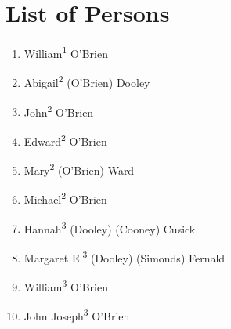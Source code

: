 \chapter{List of Persons}
\begin{enumerate}
	\item \label{per:William1OBrien} William\textsuperscript{1} O'Brien
	\item \label{per:Abigail2OBrien} Abigail\textsuperscript{2} (O'Brien) Dooley
	\item \label{per:John2OBrien} John\textsuperscript{2} O'Brien
	\item \label{per:Edward2OBrien} Edward\textsuperscript{2} O'Brien
	\item \label{per:Mary2OBrien} Mary\textsuperscript{2} (O'Brien) Ward
	\item \label{per:Michael2OBrien} Michael\textsuperscript{2} O'Brien
	\item \label{per:Hannah3Dooley} Hannah\textsuperscript{3} (Dooley) (Cooney) Cusick
	\item \label{per:Margaret3Dooley} Margaret E.\textsuperscript{3} (Dooley) (Simonds) Fernald
	\item \label{per:William3OBrien} William\textsuperscript{3} O'Brien
	\item \label{per:John3OBrien} John Joseph\textsuperscript{3} O'Brien
	

\end{enumerate}


